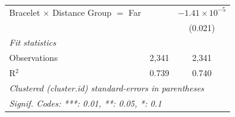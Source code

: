 \begin{tabular}{lcc}
   Bracelet $\times$ Distance Group $=$ Far    &                        & $-1.41\times 10^{-5}$\\    
                                               &                        & (0.021)\\   
   \midrule
   \emph{Fit statistics}\\
   Observations                                & 2,341                  & 2,341\\  
   R$^2$                                       & 0.739                  & 0.740\\  
   \midrule \midrule
   \multicolumn{3}{l}{\emph{Clustered (cluster.id) standard-errors in parentheses}}\\
   \multicolumn{3}{l}{\emph{Signif. Codes: ***: 0.01, **: 0.05, *: 0.1}}\\
\end{tabular}


